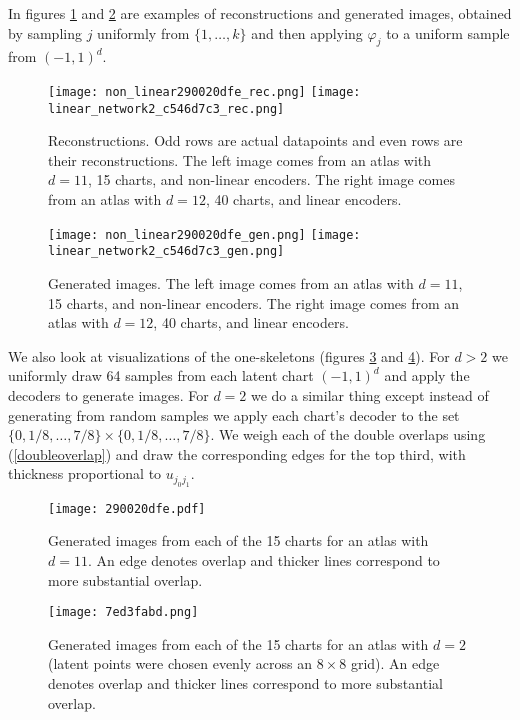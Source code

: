 \documentclass[reqno,11pt]{article}
\renewcommand{\phi}{\varphi}
\begin{document}
In figures \ref{reconstructions} and \ref{generated-images} are examples of reconstructions and generated images, obtained by sampling $j$ uniformly from $\{1,\ldots, k\}$ and then applying $\phi_j$ to a uniform sample from $(-1,1)^d$. 

\begin{figure}
\centering
\texttt{[image: non\_linear290020dfe\_rec.png]} \texttt{[image: linear\_network2\_c546d7c3\_rec.png]}
\caption{Reconstructions. Odd rows are actual datapoints and even rows are their reconstructions. The left image comes from an atlas with $d=11$, 15 charts, and non-linear encoders. The right image comes from an atlas with $d=12$, 40 charts, and linear encoders.}
\label{reconstructions}
\end{figure}

\begin{figure}
\centering
\texttt{[image: non\_linear290020dfe\_gen.png]} \texttt{[image: linear\_network2\_c546d7c3\_gen.png]}
\caption{Generated images. The left image comes from an atlas with $d=11$, 15 charts, and non-linear encoders. The right image comes from an atlas with $d=12$, 40 charts, and linear encoders.}
\label{generated-images}
\end{figure}

We also look at visualizations of the one-skeletons (figures \ref{oneskel-d11} and \ref{oneskel-d2}). For $d > 2$ we uniformly draw 64 samples from each latent chart $(-1,1)^d$ and apply the decoders to generate images. For $d=2$ we do a similar thing except instead of generating from random samples we apply each chart's decoder to the set $\{0, 1/8, \ldots, 7/8\} \times \{0, 1/8, \ldots, 7/8\}$. We weigh each of the double overlaps using (\ref{doubleoverlap}) and draw the corresponding edges for the top third, with thickness proportional to $u_{j_0j_1}$.
\begin{figure}
\centering
\texttt{[image: 290020dfe.pdf]}
\caption{Generated images from each of the 15 charts for an atlas with $d=11$.  An edge denotes overlap and thicker lines correspond to more substantial overlap.}
\label{oneskel-d11}
\end{figure}

\begin{figure}
\centering
\texttt{[image: 7ed3fabd.png]}
\caption{Generated images from each of the 15 charts for an atlas with $d=2$ (latent points were chosen evenly across an $8\times8$ grid).  An edge denotes overlap and thicker lines correspond to more substantial overlap.}
\label{oneskel-d2}
\end{figure}
\end{document}
